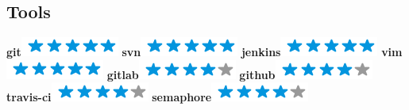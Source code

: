 \documentclass[]{friggeri-cv}
\begin{document}
\begin{aside}
    \section{Tools}
        \textbf{git}\includegraphics[scale=0.40]{img/5stars.png}
        \textbf{svn}\includegraphics[scale=0.40]{img/5stars.png}
        \textbf{jenkins}\includegraphics[scale=0.40]{img/5stars.png}
        \textbf{vim}\includegraphics[scale=0.40]{img/5stars.png}
        \textbf{gitlab}\includegraphics[scale=0.40]{img/4stars.png}
        \textbf{github}\includegraphics[scale=0.40]{img/4stars.png}
        \textbf{travis-ci}\includegraphics[scale=0.40]{img/4stars.png}
        \textbf{semaphore}\includegraphics[scale=0.40]{img/4stars.png}
        ~

\end{aside}
\end{document}
